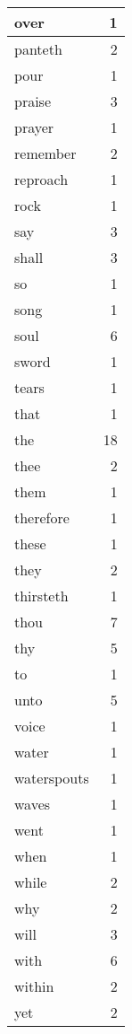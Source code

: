 \begin{center}
\begin{longtable}{l|r}
over & 1 \\ \hline
panteth & 2 \\ \hline
pour & 1 \\ \hline
praise & 3 \\ \hline
prayer & 1 \\ \hline
remember & 2 \\ \hline
reproach & 1 \\ \hline
rock & 1 \\ \hline
say & 3 \\ \hline
shall & 3 \\ \hline
so & 1 \\ \hline
song & 1 \\ \hline
soul & 6 \\ \hline
sword & 1 \\ \hline
tears & 1 \\ \hline
that & 1 \\ \hline
the & 18 \\ \hline
thee & 2 \\ \hline
them & 1 \\ \hline
therefore & 1 \\ \hline
these & 1 \\ \hline
they & 2 \\ \hline
thirsteth & 1 \\ \hline
thou & 7 \\ \hline
thy & 5 \\ \hline
to & 1 \\ \hline
unto & 5 \\ \hline
voice & 1 \\ \hline
water & 1 \\ \hline
waterspouts & 1 \\ \hline
waves & 1 \\ \hline
went & 1 \\ \hline
when & 1 \\ \hline
while & 2 \\ \hline
why & 2 \\ \hline
will & 3 \\ \hline
with & 6 \\ \hline
within & 2 \\ \hline
yet & 2 \\ \hline
\end{longtable}
\end{center}



\normalsize



